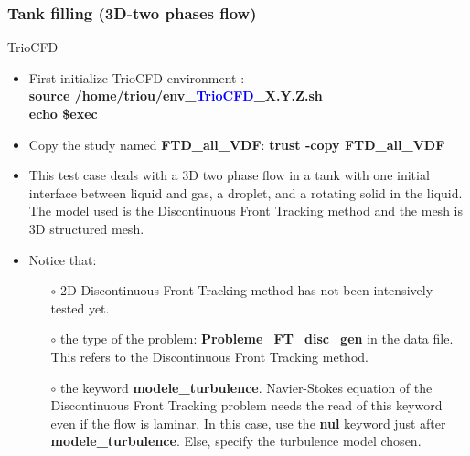 \documentclass[10pt, hyperref={unicode=true,pdfusetitle, bookmarks=true,bookmarksnumbered=false,bookmarksopen=false, breaklinks=false,pdfborder={0 0 1},backref=true,colorlinks=true,linkcolor=darkblue,pageanchor}]{beamer}
\begin{document}
\begin{frame}
\frametitle{Tank filling (3D-two phases flow)}
\begin{block}{TrioCFD}

\begin{itemize}
\item First initialize TrioCFD environment :\\
\textbf{source /home/triou/env\_\textcolor{blue}{TrioCFD}\_X.Y.Z.sh }\\
\textbf{echo \$exec} 

\item Copy the study named \textbf{FTD\_all\_VDF}: \textbf{trust -copy FTD\_all\_VDF}

\item This test case deals with a 3D two phase flow in a tank with one initial interface between liquid and gas, a droplet, and a rotating solid in the liquid. The model used is the Discontinuous Front Tracking method and the mesh is 3D structured mesh.

\item Notice that:
    \begin{itemize}
    \item [$\circ$] 2D Discontinuous Front Tracking method has not been intensively tested yet.
    \item [$\circ$] the type of the problem: \textbf{Probleme\_FT\_disc\_gen} in the data file. This refers to the Discontinuous Front Tracking method.
    \item [$\circ$] the keyword \textbf{modele\_turbulence}. Navier-Stokes equation of the Discontinuous Front Tracking problem needs the read of this keyword even if the flow is laminar. In this case, use the \textbf{nul} keyword just after \textbf{modele\_turbulence}. Else, specify the turbulence model chosen.
    \end{itemize}
\end{itemize}

\end{block}
\end{frame}
\end{document}
